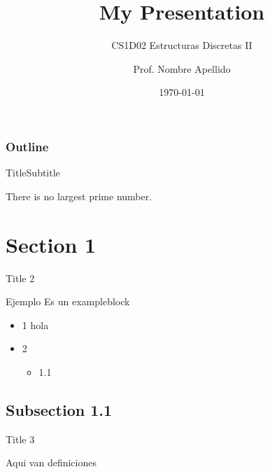 \documentclass{beamer}
\title{My Presentation}
\subtitle{CS1D02 Estructuras Discretas II}
\author{Prof. Nombre Apellido}
\institute{UTEC}
\date{\today}
\begin{document}
\begin{frame}
\titlepage
\end{frame}

{
\begin{frame}
  \frametitle{Outline}

  \tableofcontents
\end{frame}
}
\begin{frame}{Title}{Subtitle}
\begin{theorem}
There is no largest prime number.
\end{theorem}

\end{frame}
\section{Section 1}
\begin{frame}{Title 2}{}

\begin{exampleblock}{Ejemplo}
 Es un exampleblock
\end{exampleblock}

\begin{itemize}
\item 1 \alert{hola}
\item 2
  \begin{itemize}
    \item 1.1
  \end{itemize}
\end{itemize}

\end{frame}
\subsection{Subsection 1.1}
\begin{frame}{Title 3}{}
  \begin{definition}
    Aqui van definiciones
  \end{definition}
\end{frame}
\end{document}
